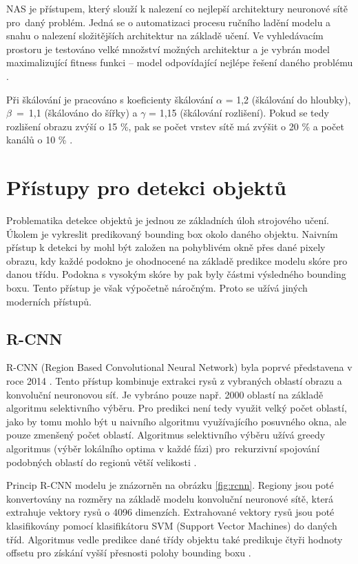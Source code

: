 NAS je přístupem, který slouží k nalezení co nejlepší architektury neuronové sítě pro~daný problém. Jedná se o automatizaci procesu ručního ladění modelu a snahu o nalezení složitějších architektur na základě učení. Ve vyhledávacím prostoru je testováno velké množství možných architektur a je vybrán model maximalizující fitness funkci -- model odpovídající nejlépe řešení daného problému \cite{NAS}.

Při škálování je pracováno s koeficienty škálování $\alpha$ = 1,2 (škálování do hloubky), $\beta$~=~1,1 (škálováno do šířky) a $\gamma$ = 1,15 (škálování rozlišení). Pokud se tedy rozlišení obrazu zvýší o 15 \%, pak se počet vrstev sítě má zvýšit o 20 \% a počet kanálů o 10 \% \cite{EfficientNet, EfficientNetBlog}.


\section{Přístupy pro detekci objektů}
\label{sec:detekce}
Problematika detekce objektů je jednou ze základních úloh strojového učení. Úkolem je vykreslit predikovaný bounding box okolo daného objektu. Naivním přístup k detekci by mohl být založen na pohyblivém okně přes dané pixely obrazu, kdy každé podokno je ohodnocené na základě predikce modelu skóre pro danou třídu. Podokna s vysokým skóre by pak byly částmi výsledného bounding boxu. Tento přístup je však výpočetně náročným. Proto se užívá jiných moderních přístupů. 
\subsection{R-CNN}
R-CNN (Region Based Convolutional Neural Network) byla poprvé představena v roce 2014 \cite{RCNN}. Tento přístup kombinuje extrakci rysů z vybraných oblastí obrazu a konvoluční neuronovou síť. Je vybráno pouze např. 2000 oblastí na základě algoritmu selektivního výběru. Pro predikci není tedy využit velký počet oblastí, jako by tomu mohlo být u naivního algoritmu využívajícího posuvného okna, ale pouze zmenšený počet oblastí. Algoritmus selektivního výběru užívá greedy algoritmus (výběr lokálního optima v každé fázi) pro~rekurzivní spojování podobných oblastí do regionů větší velikosti \cite{ObjectDetectionAlgorithms}. 

Princip R-CNN modelu je znázorněn na obrázku \ref{fig:rcnn}. Regiony jsou poté konvertovány na rozměry na základě modelu konvoluční neuronové sítě, která extrahuje vektory rysů o 4096 dimenzích. Extrahované vektory rysů jsou poté klasifikovány pomocí klasifikátoru SVM (Support Vector Machines) do daných tříd. Algoritmus vedle predikce dané třídy objektu také predikuje čtyři hodnoty offsetu pro získání vyšší přesnosti polohy bounding boxu \cite{ObjectDetectionAlgorithms}.

